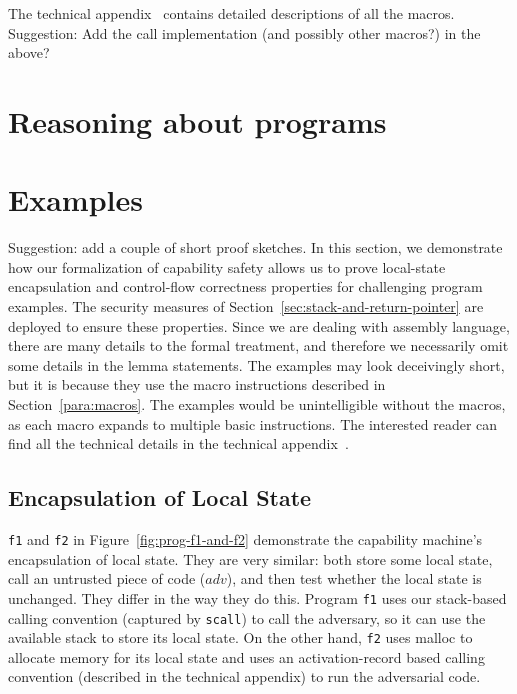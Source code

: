 \documentclass[format=acmsmall, review=false, screen=true]{acmart}
\renewcommand{\figurename}{Figure}
\renewcommand{\sectionname}{Section}
\newcommand{\var}[1]{\mathit{#1}}
\newcommand{\adv}{\var{adv}}
\newenvironment{toplas}
    {\color{OliveGreen}
          
    }{}
\newcommand{\itoplassug}[1]
    {{\color{Blue} #1}}
\begin{document}
\begin{toplas}
The technical appendix~\citep{technical_appendix} contains detailed descriptions
of all the macros.
\itoplassug{Suggestion: Add the call implementation (and possibly other macros?) in the above?}
\end{toplas}

\begin{toplas}
\section{Reasoning about programs}
\label{sec:reasoning}

\end{toplas}

\section{Examples}
\label{sec:examples}
\itoplassug{Suggestion: add a couple of short proof sketches.}
In this section, we demonstrate how our formalization of capability safety
allows us to prove local-state encapsulation and control-flow correctness
properties for challenging program examples. The security measures
of \sectionname~\ref{sec:stack-and-return-pointer} are deployed to ensure these
properties. Since we are dealing with assembly language, there are many details
to the formal treatment, and therefore we necessarily omit some details in the
lemma statements. The examples may look deceivingly short, but it is because
they use the macro instructions described in \sectionname~\ref{para:macros}.
The examples would be
unintelligible without the macros, as each macro expands to multiple basic instructions. The interested reader can find all the
technical details in the technical appendix~\citep{technical_appendix}.

\subsection{Encapsulation of Local State}
\texttt{\footnotesize{f1}} and \texttt{\footnotesize{f2}} in
\figurename~\ref{fig:prog-f1-and-f2} demonstrate the capability
machine's encapsulation of local state. They are very similar: both
store some local state, call an untrusted piece of code ($\adv$), and
then test whether the local state is unchanged. They differ in the way
they do this. Program \texttt{\footnotesize{f1}} uses our stack-based
calling convention (captured by \texttt{\footnotesize{scall}}) to call
the adversary, so it can use the available stack to store its local
state.  On the other hand, \texttt{\footnotesize{f2}} uses malloc to
allocate memory for its local state and uses an activation-record
based calling convention (described in the technical appendix) to run
the adversarial code.
\end{document}
